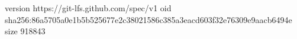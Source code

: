 version https://git-lfs.github.com/spec/v1
oid sha256:86a5705a0e1b5b525677e2c38021586c385a3eacd603f32e76309e9aacb6494e
size 918843
